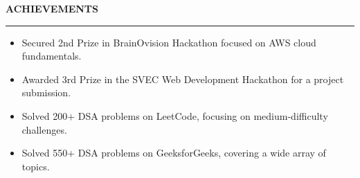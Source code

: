 \documentclass[10pt,a4paper]{article}
\newcommand{\compactspace}{\vspace{5pt}}
\newcommand{\sectiongap}{\vspace{10pt}}
\newcommand{\resumesection}[1]{
    \sectiongap
    {\color{primary} \large \textbf{#1}} \\
    \hrule height 1pt \compactspace
}
\begin{document}
\resumesection{ACHIEVEMENTS}
\begin{itemize}
    \item Secured 2nd Prize in BrainOvision Hackathon focused on AWS cloud fundamentals.
    \item Awarded 3rd Prize in the SVEC Web Development Hackathon for a project submission.
    \item Solved 200+ DSA problems on LeetCode, focusing on medium-difficulty challenges.
    \item Solved 550+ DSA problems on GeeksforGeeks, covering a wide array of topics.
\end{itemize}
\end{document}
